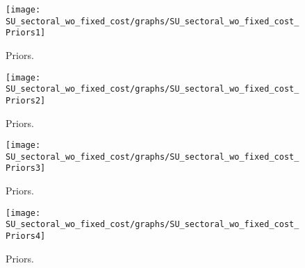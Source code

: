  
\begin{figure}[H]
\centering
\texttt{[image: SU\_sectoral\_wo\_fixed\_cost/graphs/SU\_sectoral\_wo\_fixed\_cost\_Priors1]}
\caption{Priors.}\label{Fig:Priors:1}
\end{figure}
\begin{figure}[H]
\centering
\texttt{[image: SU\_sectoral\_wo\_fixed\_cost/graphs/SU\_sectoral\_wo\_fixed\_cost\_Priors2]}
\caption{Priors.}\label{Fig:Priors:2}
\end{figure}
\begin{figure}[H]
\centering
\texttt{[image: SU\_sectoral\_wo\_fixed\_cost/graphs/SU\_sectoral\_wo\_fixed\_cost\_Priors3]}
\caption{Priors.}\label{Fig:Priors:3}
\end{figure}
\begin{figure}[H]
\centering
\texttt{[image: SU\_sectoral\_wo\_fixed\_cost/graphs/SU\_sectoral\_wo\_fixed\_cost\_Priors4]}
\caption{Priors.}\label{Fig:Priors:4}
\end{figure}
 
